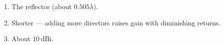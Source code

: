 \begin{enumerate}[leftmargin=1.6em,itemsep=2pt]
\item The reflector (about $0.505\lambda$).
\item Shorter --- adding more directors raises gain with diminishing returns.
\item About $10\ \text{dBi}$.
\end{enumerate}
